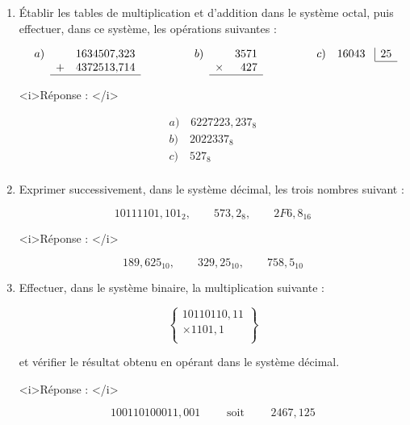 \begin{enumerate} [label=\arabic*$^\circ$]
\item Établir les tables de multiplication et d'addition dans le système octal, puis effectuer, dans ce système, les opérations suivantes : 

\medskip

\[
\begin{array}{rcr@{\hspace*{0mm}}lc@{\hspace*{15mm}}rcrc@{\hspace*{15mm}}rc@{\hspace*{3mm}}|r}
a) & & 1634507,&323 && b) & & 3571&&c)  & 16043& 25 \\
\cline {12-12} 
  & + & 4372513,&714 && & \times & 427 &&\\
\cline {2-4} \cline{7-8}
\end{array}
\]

\medskip 

<i>Réponse : </i>

\[
\begin{array}{l} 
   a)\quad  6227223,237_8 \\
   b)\quad  2022337_8 \\
   c) \quad 527_8 \\      
\end{array}
\]

\newpage 

\item Exprimer successivement, dans le système décimal, les trois nombres suivant : 

\[   10111101,101_2, \qquad 573,2_8, \qquad 2F6,8_{16} \]


<i>Réponse : </i>


\[ 189,625_{10}, \qquad 329,25_{10}, \qquad 758,5_{10} \]


\item Effectuer, dans le système binaire, la multiplication suivante : 

\[ \left\lbrace \begin{array}{r} 
                  10110110,11 \\
                  \times 1101,1\\
                \end{array} 
   \right\rbrace
\]

et vérifier le résultat obtenu en opérant dans le système décimal.

<i>Réponse : </i>

\[ 100110100011,001 \qquad \text{ soit } \qquad 2467,125 \] 
                


\end{enumerate}
